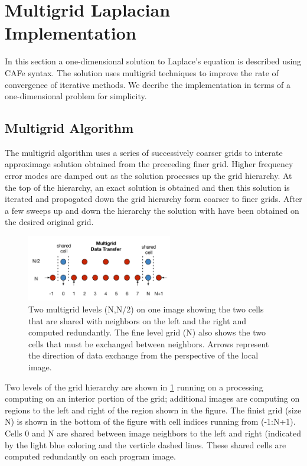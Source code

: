 \section{Multigrid Laplacian Implementation}

In this section a one-dimensional solution to Laplace's equation is described using CAFe
syntax.  The solution uses multigrid techniques to improve the rate of convergence
of iterative methods.  We decribe the implementation in terms of a one-dimensional
problem for simplicity.

\subsection{Multigrid Algorithm}

The multigrid algorithm uses a series of successively coarser grids to interate
approximage solution obtained from the preceeding finer grid.  Higher frequency error modes are
damped out as the solution processes up the grid hierarchy.  At the top of the
hierarchy, an exact solution is obtained and then this solution is iterated and
propogated down the grid hierarchy form coarser to finer grids.  After a few sweeps
up and down the hierarchy the solution with have been obtained on the desired
original grid.

\begin{figure}[!t]
\centering
\includegraphics[width=2.5in]{Fig1}
\caption{Two multigrid levels (N,N/2) on one image showing the two cells that are shared with
  neighbors on the left and the right and computed redundantly.  The fine level grid (N)
  also shows the two cells that must be exchanged between neighbors.  Arrows represent the direction
  of data exchange from the perspective of the local image.}
\label{fig_grids}
\end{figure}

Two levels of the grid hierarchy are shown in \ref{fig_grids} running on a processing computing on
an interior portion of the grid; additional images are computing on regions to the left and right of
the region shown in the figure.  The finist grid (size N) is shown
in the bottom of the figure with cell indices running from (-1:N+1).  Cells 0 and N are shared
between image neighbors to the left and right (indicated by the light blue coloring and the verticle
dashed lines.  These shared cells are computed redundantly on each program image.

